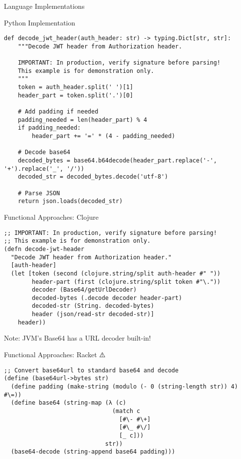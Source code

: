 \documentclass[presentation,aspectratio=169]{beamer}
\begin{document}
\begin{frame}[label={sec:org522ed70},fragile]{Language Implementations}
\begin{block}{Python Implementation 🧩}
\begin{verbatim}
def decode_jwt_header(auth_header: str) -> typing.Dict[str, str]:
    """Decode JWT header from Authorization header.

    IMPORTANT: In production, verify signature before parsing!
    This example is for demonstration only.
    """
    token = auth_header.split(' ')[1]
    header_part = token.split('.')[0]

    # Add padding if needed
    padding_needed = len(header_part) % 4
    if padding_needed:
        header_part += '=' * (4 - padding_needed)

    # Decode base64
    decoded_bytes = base64.b64decode(header_part.replace('-', '+').replace('_', '/'))
    decoded_str = decoded_bytes.decode('utf-8')

    # Parse JSON
    return json.loads(decoded_str)
\end{verbatim}
\end{block}
\begin{block}{Functional Approaches: Clojure 🧩}
\begin{verbatim}
;; IMPORTANT: In production, verify signature before parsing!
;; This example is for demonstration only.
(defn decode-jwt-header 
  "Decode JWT header from Authorization header."
  [auth-header]
  (let [token (second (clojure.string/split auth-header #" "))
        header-part (first (clojure.string/split token #"\."))
        decoder (Base64/getUrlDecoder)
        decoded-bytes (.decode decoder header-part)
        decoded-str (String. decoded-bytes)
        header (json/read-str decoded-str)]
    header))
\end{verbatim}

\alert{Note}: JVM's Base64 has a URL decoder built-in!
\end{block}
\begin{block}{Functional Approaches: Racket ⚠️}
\begin{verbatim}
;; Convert base64url to standard base64 and decode
(define (base64url->bytes str)
  (define padding (make-string (modulo (- 0 (string-length str)) 4) #\=))
  (define base64 (string-map (λ (c)
                               (match c
                                 [#\- #\+]
                                 [#\_ #\/]
                                 [_ c]))
                             str))
  (base64-decode (string-append base64 padding)))


\end{verbatim}
\end{block}
\end{frame}
\end{document}

